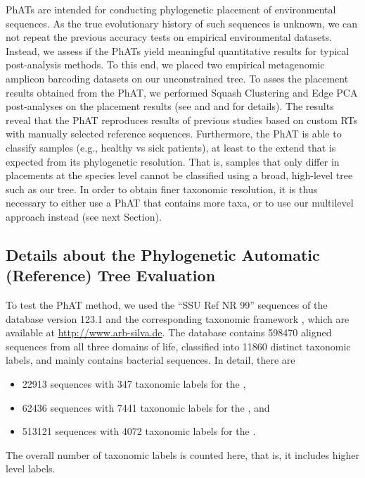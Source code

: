 \acp{PhAT} are intended for conducting phylogenetic placement of environmental sequences.
As the true evolutionary history of such sequences is unknown,
we can not repeat the previous accuracy tests on empirical environmental datasets.
Instead, we assess if the \acp{PhAT} yield meaningful quantitative results for typical post-analysis methods.
To this end, we placed two empirical metagenomic amplicon barcoding datasets on our unconstrained  tree.
To asses the placement results obtained from the \ac{PhAT},
we performed Squash Clustering and Edge PCA \citep{Matsen2011a} post-analyses on the placement results
(see  and
 and  for details).
The results reveal that the \ac{PhAT} reproduces results of previous studies
based on custom \acp{RT} with manually selected reference sequences.
Furthermore, the \ac{PhAT} is able to classify samples (e.g., healthy vs sick patients),
at least to the extend that is expected from its phylogenetic resolution.
That is, samples that only differ in placements at the species level
cannot be classified using a broad, high-level tree such as our  tree.
In order to obtain finer taxonomic resolution, it is thus necessary to either use a \ac{PhAT} that contains more taxa,
or to use our multilevel approach instead (see next Section).


\subsection{Details about the Phylogenetic Automatic (Reference) Tree Evaluation}
\label{ch:AutomaticTrees:sec:Evaluation:sub:DetailsEvaluationReferenceTrees}

To test the \acf{PhAT} method,
we used the ``SSU Ref NR 99'' sequences of the  database \citep{Quast2013} version 123.1
and the corresponding taxonomic framework \citep{Yilmaz2014}, which are available at \url{http://www.arb-silva.de}.
The database contains \num{598 470} aligned sequences from all three domains of life,
classified into \num{11 860} distinct taxonomic labels,
and mainly contains bacterial sequences.
In detail, there are
\begin{itemize}
    \item \num{ 22 913} sequences with \num{  347} taxonomic labels for the ,
    \item \num{ 62 436} sequences with \num{7 441} taxonomic labels for the , and
    \item \num{513 121} sequences with \num{4 072} taxonomic labels for the .
\end{itemize}
The overall number of taxonomic labels is counted here, that is, it includes higher level labels.


